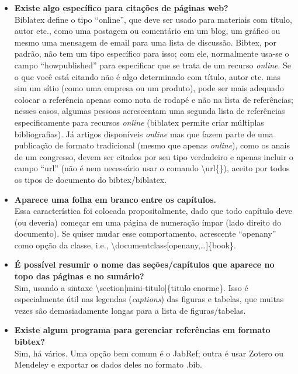 \begin{itemize}
\item \textbf{Existe algo específico para citações de páginas web?}\\
Biblatex define o tipo ``online'', que deve ser usado para materiais com título, autor etc., como uma postagem ou comentário em um blog, um gráfico ou mesmo uma mensagem de email para uma lista de discussão. Bibtex, por padrão, não tem um tipo específico para isso; com ele, normalmente usa-se o campo ``howpublished'' para especificar que se trata de um recurso \textit{online}. Se o que você está citando não é algo determinado com título, autor etc. mas sim um sítio (como uma empresa ou um produto), pode ser mais adequado colocar a referência apenas como nota de rodapé e não na lista de referências; nesses casos, algumas pessoas acrescentam uma segunda lista de referências especificamente para recursos \textit{online} (biblatex permite criar múltiplas bibliografias). Já artigos disponíveis \textit{online} mas que fazem parte de uma publicação de formato tradicional (mesmo que apenas \textit{online}), como os anais de um congresso, devem ser citados por seu tipo verdadeiro e apenas incluir o campo ``url'' (não é nem necessário usar o comando \textsf{\textbackslash{}url\{\}}), aceito por todos os tipos de documento do bibtex/biblatex.

\item \textbf{Aparece uma folha em branco entre os capítulos.}\\
Essa característica foi colocada propositalmente, dado que todo capítulo deve (ou deveria) começar em uma página de numeração ímpar (lado direito do documento). Se quiser mudar esse comportamento, acrescente ``openany'' como opção da classe, i.e., \textsf{\textbackslash{}documentclass[openany,\dots]\{book\}}.

\item \textbf{É possível resumir o nome das seções/capítulos que aparece no topo das páginas e no sumário?}\\
Sim, usando a sintaxe \textsf{\textbackslash{}section[mini-titulo]\{titulo enorme\}}. Isso é especialmente útil nas legendas (\textit{captions}) das figuras e tabelas, que muitas vezes são demasiadamente longas para a lista de figuras/tabelas.

\item \textbf{Existe algum programa para gerenciar referências em formato bibtex?}\\
Sim, há vários. Uma opção bem comum é o JabRef; outra é usar Zotero ou Mendeley e exportar os dados deles no formato .bib.


\end{itemize}
